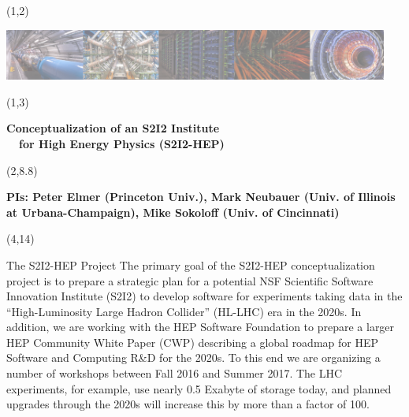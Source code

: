 \documentclass[final]{beamer}
\begin{document}
\begin{frame}{} 




\begin{textblock}{84.0}(1,2)
\begin{center}
\includegraphics[width=0.95\textwidth]{images/s2i2-banner-50percent.png}
\end{center}
\end{textblock}

\begin{textblock}{84.0}(1,3)
\begin{center}
\begin{Huge}
\textbf{
Conceptualization of an S2I2 Institute \\
~~for High Energy Physics (S2I2-HEP)
}
\end{Huge}
\end{center}
\end{textblock}

\begin{textblock}{84.0}(2,8.8)
\begin{center}
\begin{Large}
\textbf{
PIs: Peter Elmer (Princeton Univ.), Mark Neubauer (Univ. of Illinois \\ 
at Urbana-Champaign), Mike Sokoloff (Univ. of Cincinnati)
}
\end{Large}
\end{center}
\end{textblock}

\begin{textblock}{78.0}(4,14)
\begin{block}{The S2I2-HEP Project}
The primary goal of the S2I2-HEP conceptualization project is to
prepare a strategic plan for a potential NSF Scientific Software
Innovation Institute (S2I2) to develop software for experiments
taking data in the ``High-Luminosity Large Hadron Collider'' (HL-LHC)
era in the 2020s. In addition, we are working with the HEP Software
Foundation to prepare a larger HEP Community White Paper (CWP)
describing a global roadmap for HEP Software and Computing R\&D for
the 2020s. To this end we are organizing a number of workshops
between Fall 2016 and Summer 2017.
The LHC experiments, for example, use nearly 0.5 Exabyte of
storage today, and planned upgrades through the 2020s will increase this
by more than a factor of 100. 
\end{block}
\end{textblock}


\end{frame}
\end{document}
